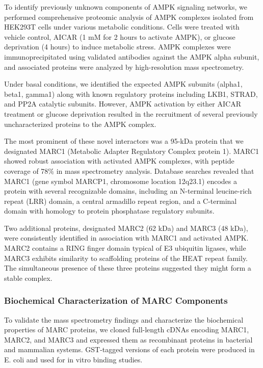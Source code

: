 \documentclass[11pt,a4paper]{article}
\begin{document}
To identify previously unknown components of AMPK signaling networks, we performed comprehensive proteomic analysis of AMPK complexes isolated from HEK293T cells under various metabolic conditions. Cells were treated with vehicle control, AICAR (1 mM for 2 hours to activate AMPK), or glucose deprivation (4 hours) to induce metabolic stress. AMPK complexes were immunoprecipitated using validated antibodies against the AMPK alpha subunit, and associated proteins were analyzed by high-resolution mass spectrometry.

Under basal conditions, we identified the expected AMPK subunits (alpha1, beta1, gamma1) along with known regulatory proteins including LKB1, STRAD, and PP2A catalytic subunits. However, AMPK activation by either AICAR treatment or glucose deprivation resulted in the recruitment of several previously uncharacterized proteins to the AMPK complex.

The most prominent of these novel interactors was a 95-kDa protein that we designated MARC1 (Metabolic Adapter Regulatory Complex protein 1). MARC1 showed robust association with activated AMPK complexes, with peptide coverage of 78\% in mass spectrometry analysis. Database searches revealed that MARC1 (gene symbol MARCP1, chromosome location 12q23.1) encodes a protein with several recognizable domains, including an N-terminal leucine-rich repeat (LRR) domain, a central armadillo repeat region, and a C-terminal domain with homology to protein phosphatase regulatory subunits.

Two additional proteins, designated MARC2 (62 kDa) and MARC3 (48 kDa), were consistently identified in association with MARC1 and activated AMPK. MARC2 contains a RING finger domain typical of E3 ubiquitin ligases, while MARC3 exhibits similarity to scaffolding proteins of the HEAT repeat family. The simultaneous presence of these three proteins suggested they might form a stable complex.

\subsubsection{Biochemical Characterization of MARC Components}

To validate the mass spectrometry findings and characterize the biochemical properties of MARC proteins, we cloned full-length cDNAs encoding MARC1, MARC2, and MARC3 and expressed them as recombinant proteins in bacterial and mammalian systems. GST-tagged versions of each protein were produced in E. coli and used for in vitro binding studies.
\end{document}
